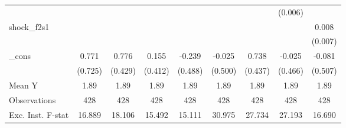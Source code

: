 {\begin{tabular}{l*{8}{c}}
            &                     &                     &                     &                     &                     &                     &     (0.006)         &                     \\
\addlinespace
shock\_f2s1  &                     &                     &                     &                     &                     &                     &                     &       0.008         \\
            &                     &                     &                     &                     &                     &                     &                     &     (0.007)         \\
\addlinespace
\_cons      &       0.771         &       0.776\sym{*}  &       0.155         &      -0.239         &      -0.025         &       0.738         &      -0.025         &      -0.081         \\
            &     (0.725)         &     (0.429)         &     (0.412)         &     (0.488)         &     (0.500)         &     (0.437)         &     (0.466)         &     (0.507)         \\
\midrule
Mean Y      &        1.89         &        1.89         &        1.89         &        1.89         &        1.89         &        1.89         &        1.89         &        1.89         \\
Observations&         428         &         428         &         428         &         428         &         428         &         428         &         428         &         428         \\
Exc. Inst. F-stat&      16.889         &      18.106         &      15.492         &      15.111         &      30.975         &      27.734         &      27.193         &      16.690         \\
\bottomrule
\end{tabular}
}
